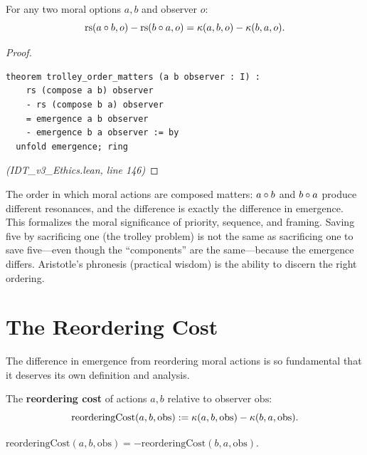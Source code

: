\begin{theorem}
\label{thm:trolley-order}
For any two moral options $a, b$ and observer $o$:
\[
  \mathrm{rs}(a \circ b, o) - \mathrm{rs}(b \circ a, o) = \kappa(a, b, o) - \kappa(b, a, o).
\]
\end{theorem}

\begin{proof}
\begin{lstlisting}
theorem trolley_order_matters (a b observer : I) :
    rs (compose a b) observer
    - rs (compose b a) observer
    = emergence a b observer
    - emergence b a observer := by
  unfold emergence; ring
\end{lstlisting}
\textit{(IDT\_v3\_Ethics.lean, line 146)}
\end{proof}

\begin{interpretation}
The order in which moral actions are composed matters: $a \circ b$ and
$b \circ a$ produce different resonances, and the difference is exactly the
difference in emergence. This formalizes the moral significance of priority,
sequence, and framing. Saving five by sacrificing one (the trolley problem) is
not the same as sacrificing one to save five---even though the ``components''
are the same---because the emergence differs. Aristotle's phronesis (practical
wisdom) is the ability to discern the right ordering.
\end{interpretation}

\section{The Reordering Cost}
\label{sec:reordering-cost}

The difference in emergence from reordering moral actions is so fundamental
that it deserves its own definition and analysis.

\begin{definition}
\label{def:reordering-cost}
The \textbf{reordering cost} of actions $a, b$ relative to observer
$\mathrm{obs}$:
\[
  \mathrm{reorderingCost}(a, b, \mathrm{obs}) := \kappa(a, b, \mathrm{obs})
  - \kappa(b, a, \mathrm{obs}).
\]
\end{definition}

\begin{theorem}
\label{thm:reordering-antisymm}
$\mathrm{reorderingCost}(a, b, \mathrm{obs}) = -\mathrm{reorderingCost}(b, a, \mathrm{obs})$.
\end{theorem}

